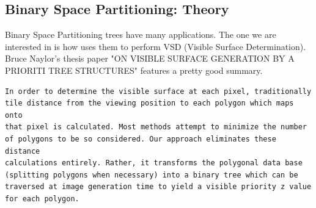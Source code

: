 \pagebreak

\subsection{Binary Space Partitioning: Theory} \label{Binary Space Partitioning: Theory}
Binary Space Partitioning trees have many applications. The one we are interested in is how \doom uses them to perform VSD (Visible Surface Determination). Bruce Naylor's thesis paper "ON VISIBLE SURFACE GENERATION BY A PRIORITI TREE STRUCTURES" features a pretty good summary.\\

 \begin{verbatim}
In order to determine the visible surface at each pixel, traditionally
tile distance from the viewing position to each polygon which maps onto 
that pixel is calculated. Most methods attempt to minimize the number 
of polygons to be so considered. Our approach eliminates these distance
calculations entirely. Rather, it transforms the polygonal data base 
(splitting polygons when necessary) into a binary tree which can be 
traversed at image generation time to yield a visible priority z value
for each polygon.
\end{verbatim}

